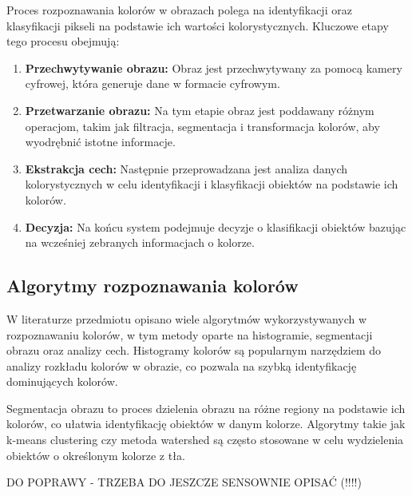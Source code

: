 Proces rozpoznawania kolorów w obrazach polega na identyfikacji oraz klasyfikacji pikseli na podstawie ich wartości kolorystycznych. Kluczowe etapy tego procesu obejmują:

\begin{enumerate}
    \item \textbf{Przechwytywanie obrazu:} Obraz jest przechwytywany za pomocą kamery cyfrowej, która generuje dane w formacie cyfrowym. 
    \item \textbf{Przetwarzanie obrazu:} Na tym etapie obraz jest poddawany różnym operacjom, takim jak filtracja, segmentacja i transformacja kolorów, aby wyodrębnić istotne informacje. 
    \item \textbf{Ekstrakcja cech:} Następnie przeprowadzana jest analiza danych kolorystycznych w celu identyfikacji i klasyfikacji obiektów na podstawie ich kolorów. 
    \item \textbf{Decyzja:} Na końcu system podejmuje decyzje o klasifikacji obiektów bazując na wcześniej zebranych informacjach o kolorze.
\end{enumerate}

\subsection{Algorytmy rozpoznawania kolorów}

W literaturze przedmiotu opisano wiele algorytmów wykorzystywanych w rozpoznawaniu kolorów, w tym metody oparte na histogramie, segmentacji obrazu oraz analizy cech. Histogramy kolorów są popularnym narzędziem do analizy rozkładu kolorów w obrazie, co pozwala na szybką identyfikację dominujących kolorów.

Segmentacja obrazu to proces dzielenia obrazu na różne regiony na podstawie ich kolorów, co ułatwia identyfikację obiektów w danym kolorze. Algorytmy takie jak k-means clustering czy metoda watershed są często stosowane w celu wydzielenia obiektów o określonym kolorze z tła.

DO POPRAWY - TRZEBA DO JESZCZE SENSOWNIE OPISAĆ (!!!!)
